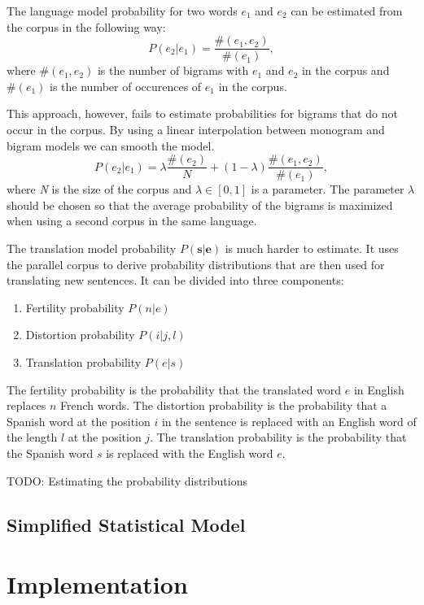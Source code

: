 \documentclass[12pt]{article}
\begin{document}
The language model probability for two words $e_1$ and $e_2$ can be estimated from the corpus in the following way:
\begin{equation}
P(e_2 | e_1) = \frac{\#(e_1, e_2)}{\#(e_1)},
\end{equation}
where $\#(e_1, e_2)$ is the number of bigrams with $e_1$ and $e_2$ in the corpus and $\#(e_1)$ is the number of occurences of $e_1$ in the corpus.

This approach, however, fails to estimate probabilities for bigrams that do not occur in the corpus.
By using a linear interpolation between monogram and bigram models we can smooth the model.
\begin{equation}
P(e_2 | e_1) = \lambda \frac{\#(e_2)}{N} + (1 - \lambda) \frac{\#(e_1, e_2)}{\#(e_1)},
\end{equation}
where \emph{N} is the size of the corpus and $\lambda \in \left [ 0,1 \right ]$ is a parameter.
The parameter $\lambda$ should be chosen so that the average probability of the bigrams is maximized when using a second corpus in the same language.

The translation model probability $P(\mathbf{s}|\mathbf{e})$ is much harder to estimate.
It uses the parallel corpus to derive probability distributions that are then used for translating new sentences.
It can be divided into three components:
\begin{enumerate}
	\item Fertility probability $P(n|e)$
	\item Distortion probability $P(i|j,l)$
	\item Translation probability $P(e|s)$
\end{enumerate}

The fertility probability is the probability that the translated word $e$ in English replaces $n$ French words.
The distortion probability is the probability that a Spanish word at the position $i$ in the sentence is replaced with an English word of the length $l$ at the position $j$.
The translation probability is the probability that the Spanish word $s$ is replaced with the English word $e$.

TODO: Estimating the probability distributions

\subsection{Simplified Statistical Model}




\section{Implementation}
\end{document}
